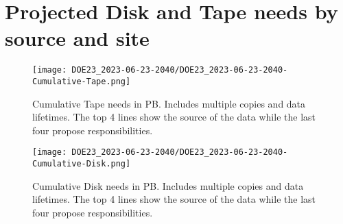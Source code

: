 \section{Projected Disk and Tape needs by source and site}
\begin{figure}[h]
\centering\texttt{[image: DOE23\_2023-06-23-2040/DOE23\_2023-06-23-2040-Cumulative-Tape.png]}
\caption{Cumulative Tape needs in PB. Includes multiple copies and data lifetimes. The top 4 lines show the source of the data while the last four propose responsibilities.}
\label{fig:Cumulative-Tape}
\end{figure}
\begin{figure}[h]
\centering\texttt{[image: DOE23\_2023-06-23-2040/DOE23\_2023-06-23-2040-Cumulative-Disk.png]}
\caption{Cumulative Disk needs in PB. Includes multiple copies and data lifetimes. The top 4 lines show the source of the data while the last four propose responsibilities.}
\label{fig:Cumulative-Disk}
\end{figure}
